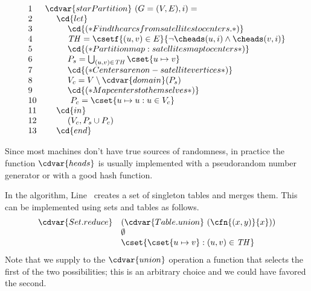 \begin{flex}
\begin{algorithm}
\[
\begin{array}{ll}
1 & \cdvar{starPartition}~(G=(V,E),i) =
\\
2 & ~~~~\cd{let}
\\
3 & ~~~~~~~~\cd{(* Find the arcs from satellites to centers. *)}
\\
4 & ~~~~~~~~\mathit{TH} = \csetf{(u,v) \in E}{\neg \cheads(u,i) \land \cheads(v,i)} %
\\
5 & ~~~~~~~~\cd{(* Partition map: satellites map to centers *)}
\\
6 & ~~~~~~~~P_s = \bigcup_{(u,v) \in \mathit{TH}} \cset{u \mapsto v}
\\
7 & ~~~~~~~~\cd{(* Centers are non-satellite vertices *)}
\\
8 & ~~~~~~~~V_c = V \setminus \cdvar{domain}(P_s)
\\
9 & ~~~~~~~~\cd{(* Map centers to themselves *)}
\\
10 & ~~~~~~~~~P_c = \cset{u \mapsto u : u \in V_c} %
\\
11 & ~~~~\cd{in}
\\
12 & ~~~~~~~~(V_c, P_s \cup P_c)
\\
13 & ~~~~\cd{end}
\end{array}
\]
\end{algorithm}

\begin{note}
\label{graphcon::star::partition::implementing-heads}

Since most machines don't have true sources of randomness, in practice
the function $\cdvar{heads}$ is usually implemented with a
pseudorandom number generator or with a good hash function.

In the algorithm, Line~\linegcstarmerge{} creates a set of
singleton tables and merges them.
%
This can be implemented using sets and tables as follows.
%
\[
\begin{array}{ll}
  \cdvar{Set.reduce}
  & (\cdvar{Table.union}~(\cfn{(x,y)}{x}))
\\
& \emptyset
\\
& \cset{\cset{u \mapsto v} : (u,v) \in \mathit{TH}}
\end{array}
\]
Note that we supply to the $\cdvar{union}$ operation a function that selects the first of the two possibilities; this is an arbitrary choice and we could have favored the second.
\end{note}

\begin{example}
\label{ex:graphcon::star::partition::alg}


\end{example}
\end{flex}
